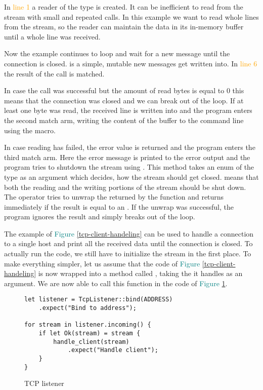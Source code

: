 In \textcolor{orange}{line 1} a reader of the type  is created. It can be inefficient to read
from the stream with small and repeated calls. In this example we want to read whole lines from the stream, so the
reader can maintain the data in its in-memory buffer until a whole line was received.

Now the example continues to loop and wait for a new message until the connection is closed.  is a simple,
mutable  new messages get written into. In \textcolor{orange}{line 6} the result of the call
 is matched.

In case the call was successful but the amount of read bytes is equal to 0 this means that the connection was closed
and we can break out of the loop. If at least one byte was read, the received line is written into  and the
program enters the second match arm, writing the content of the buffer to the command line using the
 macro.

In case reading has failed, the error value is returned and the program enters the third match arm. Here the error
message is printed to the error output and the program tries to shutdown the stream using
. This method takes an enum of the type  as an argument which
decides, how the stream should get closed.  means that both the reading and the writing portions of the
stream should be shut down. The  operator tries to unwrap the  returned by the function and
returns immediately if the result is equal to an . If the unwrap was successful, the program ignores the
result and simply breaks out of the loop.

The example of \textcolor{teal}{Figure \ref{tcp-client-handeling}} can be used to handle a connection to a single host
and print all the received data until the connection is closed. To actually run the code, we still have to initialize
the stream in the first place. To make everything simpler, let us assume that the code of
\textcolor{teal}{Figure \ref{tcp-client-handeling}} is now wrapped into a method called , taking
the  it handles as an argument. We are now able to call this function in the code of
\textcolor{teal}{Figure \ref{tcp-listener}}.

\begin{figure}[ht]
    \begin{verbatim}
let listener = TcpListener::bind(ADDRESS)
    .expect("Bind to address");

for stream in listener.incoming() {
    if let Ok(stream) = stream {
        handle_client(stream)
            .expect("Handle client");
    }
}
    \end{verbatim}
    \caption{TCP listener}
    \label{tcp-listener}
\end{figure}

